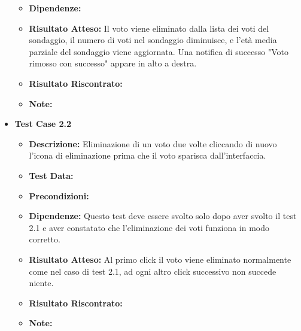 \begin{itemize}
\begin{itemize}
                    \item \textbf{Dipendenze:}
                    \item \textbf{Risultato Atteso:} Il voto viene eliminato dalla lista dei voti del sondaggio, il numero di voti nel sondaggio diminuisce, e l'età media parziale del sondaggio viene aggiornata. Una notifica di successo "Voto rimosso con successo" appare in alto a destra.
                    \item \textbf{Risultato Riscontrato:}
                    \item \textbf{Note:}
                \end{itemize}
            \item \textbf{Test Case 2.2}
                \begin{itemize}
                    \item \textbf{Descrizione:} Eliminazione di un voto due volte cliccando di nuovo l'icona di eliminazione prima che il voto sparisca dall'interfaccia.
                    \item \textbf{Test Data:}
                    \item \textbf{Precondizioni:}
                    \item \textbf{Dipendenze:} Questo test deve essere svolto solo dopo aver svolto il test 2.1 e aver constatato che l'eliminazione dei voti funziona in modo corretto.
                    \item \textbf{Risultato Atteso:} Al primo click il voto viene eliminato normalmente come nel caso di test 2.1, ad ogni altro click successivo non succede niente.
                    \item \textbf{Risultato Riscontrato:}
                    \item \textbf{Note:}
                \end{itemize}
        \end{itemize}



